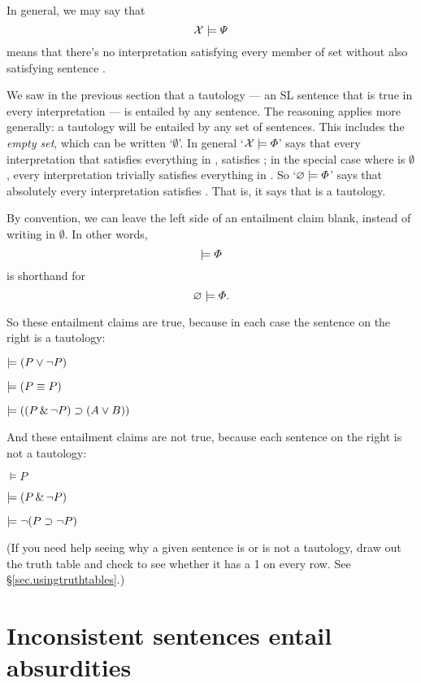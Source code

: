 In general, we may say that $$\mathcal{X}{}\models\varPsi{}$$ means that there's no interpretation satisfying every member of set \metaSetX{} without also satisfying sentence \metaB{}.

We saw in the previous section that a tautology ---  an SL sentence that is true in every interpretation --- is entailed by any sentence. The reasoning applies more generally: a tautology will be entailed by any set of sentences. This includes the \emph{empty set}, which can be written `$\emptyset$'. In general `$\mathcal{X}{} \models \varPhi{}$' says that every interpretation that satisfies everything in \metaSetX{}, satisfies \metaA{}; in the special case where \metaSetX{} is $\emptyset$, every interpretation trivially satisfies everything in \metaSetX{}. So `$\varnothing \models \varPhi{}$' says that absolutely every interpretation satisfies \metaA{}. That is, it says that \metaA{} is a tautology.

By convention, we can leave the left side of an entailment claim blank, instead of writing in $\emptyset$. In other words, $$\models \varPhi{} $$ is shorthand for $$ \varnothing \models \varPhi{}.$$

So these entailment claims are true, because in each case the sentence on the right is a tautology:

\begin{earg}
\item[] $\models (P \vee \neg P)$
\item[] $\models (P \equiv P)$
\item[] $\models ((P \,\&\,\neg P)\supset (A \vee B))$
\end{earg}

And these entailment claims are not true, because each sentence on the right is not a tautology:

\begin{earg}
\item[] $\models P$
\item[] $\models (P \,\&\, \neg P)$
\item[] $\models \neg(P \supset \neg P)$
\end{earg}

(If you need help seeing why a given sentence is or is not a tautology, draw out the truth table and check to see whether it has a 1 on every row. See \S\ref{sec.usingtruthtables}.)

\section{Inconsistent sentences entail absurdities}

